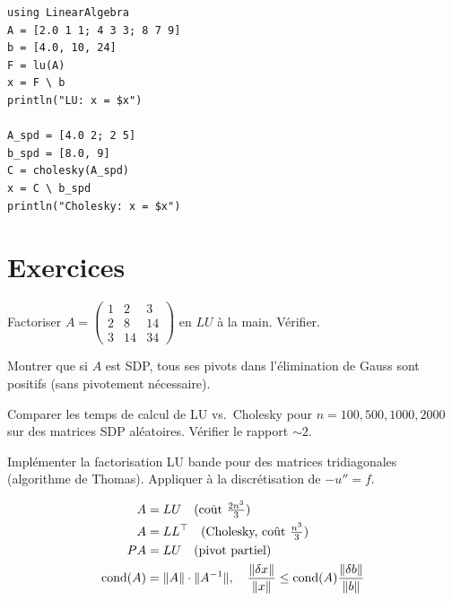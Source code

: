 \begin{codeblock}[title=\textbf{Julia}]
\begin{verbatim}
using LinearAlgebra
A = [2.0 1 1; 4 3 3; 8 7 9]
b = [4.0, 10, 24]
F = lu(A)
x = F \ b
println("LU: x = $x")

A_spd = [4.0 2; 2 5]
b_spd = [8.0, 9]
C = cholesky(A_spd)
x = C \ b_spd
println("Cholesky: x = $x")
\end{verbatim}
\end{codeblock}

\section{Exercices}

\begin{exercice}[$\star$]
Factoriser $A=\begin{pmatrix}1&2&3\\2&8&14\\3&14&34\end{pmatrix}$ en $LU$ \`a la main. V\'erifier.
\end{exercice}

\begin{exercice}[$\star\star$]
Montrer que si $A$ est SDP, tous ses pivots dans l'\'elimination de Gauss sont positifs (sans pivotement n\'ecessaire).
\end{exercice}

\begin{exercice}[$\star\star$]
Comparer les temps de calcul de LU vs.\ Cholesky pour $n=100,500,1000,2000$ sur des matrices SDP al\'eatoires. V\'erifier le rapport $\sim 2$.
\end{exercice}

\begin{exercice}
Impl\'ementer la factorisation LU bande pour des matrices tridiagonales (algorithme de Thomas). Appliquer \`a la discr\'etisation de $-u''=f$.
\end{exercice}

\begin{formules}
\begin{align*}
A &= LU \quad (\text{co\^ut } \tfrac{2n^3}{3}) \\
A &= LL^\top \quad (\text{Cholesky, co\^ut } \tfrac{n^3}{3}) \\
PA &= LU \quad (\text{pivot partiel}) \\
\mathrm{cond}(A) &= \|A\|\cdot\|A^{-1}\|, \quad \frac{\|\delta x\|}{\|x\|}\leq\mathrm{cond}(A)\frac{\|\delta b\|}{\|b\|}
\end{align*}
\end{formules}
